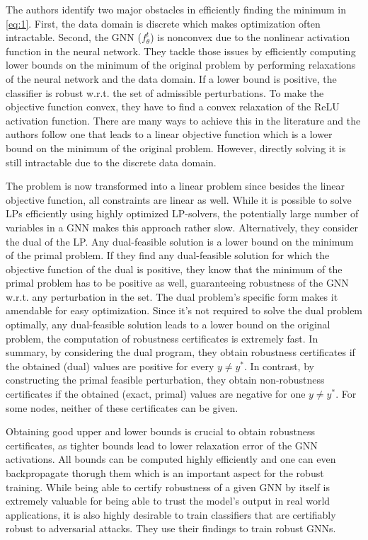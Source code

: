\documentclass[a4paper,preprint]{sig-alternate}
\begin{document}
The authors identify two major obstacles in efficiently finding the minimum in \ref{eq:1}.
First, the data domain is discrete which makes optimization often intractable. Second, the GNN ($f_{\theta}^t$) is nonconvex
due to the nonlinear activation function in the neural network. They tackle those issues by efficiently computing lower bounds
on the minimum of the original problem by performing relaxations of the neural network and the data domain.
If a lower bound is positive, the classifier is robust w.r.t. the set of admissible perturbations.
To make the objective function convex, they have to find a convex relaxation of the ReLU activation function. There are many ways to achieve this
in the literature and the authors follow one that leads to a linear objective function which is a lower bound on the minimum of the original problem.
However, directly solving it is still intractable due to the discrete data domain.

The problem is now transformed into a linear problem since besides the linear objective function, all constraints are linear as well.
While it is possible to solve LPs efficiently using highly optimized LP-solvers, the potentially large number of variables in a GNN
makes this approach rather slow. Alternatively, they consider the dual of the LP. Any dual-feasible solution 
is a lower bound on the minimum of the primal problem. If they find any dual-feasible solution for which the objective function of the dual is positive,
they know that the minimum of the primal problem has to be positive as well, guaranteeing robustness of the GNN w.r.t. any perturbation in the set.
The dual problem's specific form makes it amendable for easy optimization. Since it's not required to solve the dual problem optimally, 
any dual-feasible solution leads to a lower bound on the original problem, the computation of robustness certificates is extremely fast.
In summary, by considering the dual program, they obtain robustness certificates if the obtained (dual) values are positive for every $y \neq y^*$.
In contrast, by constructing the primal feasible perturbation, they obtain non-robustness certificates if the obtained (exact, primal) values
are negative for one $y \neq y^*$. For some nodes, neither of these certificates can be given.

\vfill
\pagebreak

Obtaining good upper and lower bounds is crucial to obtain robustness certificates, as tighter bounds lead to lower relaxation error of the GNN activations. 
All bounds can be computed highly efficiently and one can even backpropagate thorugh them which is an important aspect for the robust training.
While being able to certify robustness of a given GNN by itself is extremely valuable for being able to trust the model's output in real world
applications, it is also highly desirable to train classifiers that are certifiably robust to adversarial attacks.
They use their findings to train robust GNNs.\newline
\end{document}
